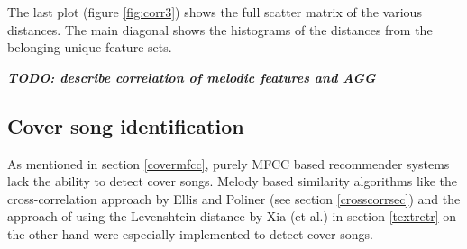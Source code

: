 \noindent The last plot (figure \ref{fig:corr3}) shows the full scatter matrix of the various distances. The main diagonal shows the histograms of the distances from the belonging unique feature-sets.

\begin{figure}[htbp]
	\centering
\end{figure}
\FloatBarrier

\textit{\textbf{TODO: describe correlation of melodic features and AGG}}

\subsection{Cover song identification}\label{covsongid}

As mentioned in section \ref{covermfcc}, purely MFCC based recommender systems lack the ability to detect cover songs. Melody based similarity algorithms like the cross-correlation approach by Ellis and Poliner (see section \ref{crosscorrsec}) and the approach of using the Levenshtein distance by Xia (et al.) in section \ref{textretr} on the other hand were especially implemented to detect cover songs. 


